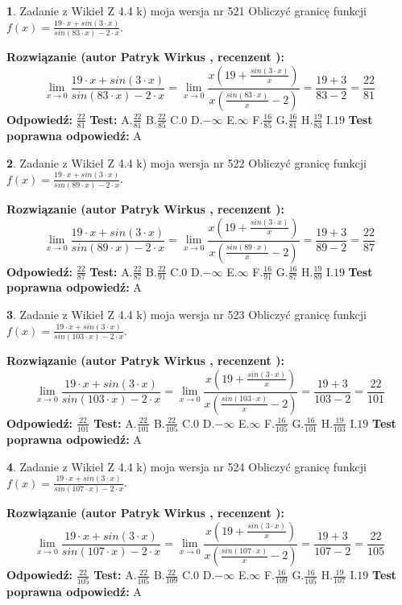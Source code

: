 \documentclass[12pt, a4paper]{article}
\theoremstyle{definition} %
\newtheorem{zad}{}
\newcommand{\zadStart}[1]{\begin{zad}#1\newline}
\newcommand{\zadStop}{\end{zad}}
\newcommand{\rozwStart}[2]{\noindent \textbf{Rozwiązanie (autor #1 , recenzent #2): }\newline}
\newcommand{\rozwStop}{\newline}
\newcommand{\odpStart}{\noindent \textbf{Odpowiedź:}\newline}
\newcommand{\odpStop}{\newline}
\newcommand{\testStart}{\noindent \textbf{Test:}\newline}
\newcommand{\testStop}{\newline}
\newcommand{\kluczStart}{\noindent \textbf{Test poprawna odpowiedź:}\newline}
\newcommand{\kluczStop}{\newline}
\begin{document}
\zadStart{Zadanie z Wikieł Z 4.4 k) moja wersja nr 521}
Obliczyć granicę funkcji $f(x)=\frac{19\cdot x +sin(3\cdot x)}{sin(83\cdot x) -2\cdot x}$.
\zadStop
\rozwStart{Patryk Wirkus}{}
$$\lim\limits_{x\to 0}\frac{19\cdot x +sin(3\cdot x)}{sin(83\cdot x) -2\cdot x}
=\lim\limits_{x\to 0}\frac{x(19+\frac{sin(3\cdot x)}{x})}{x(\frac{sin(83\cdot x)}{x}-2)}
=\frac{19+3}{83-2} = \frac{22}{81}$$
\rozwStop
\odpStart
$\frac{22}{81}$
\odpStop
\testStart
A.$\frac{22}{81}$
B.$\frac{22}{85}$
C.$0$
D.$-\infty$
E.$\infty$
F.$\frac{16}{85}$
G.$\frac{16}{81}$
H.$\frac{19}{83}$
I.$19$
\testStop
\kluczStart
A
\kluczStop



\zadStart{Zadanie z Wikieł Z 4.4 k) moja wersja nr 522}
Obliczyć granicę funkcji $f(x)=\frac{19\cdot x +sin(3\cdot x)}{sin(89\cdot x) -2\cdot x}$.
\zadStop
\rozwStart{Patryk Wirkus}{}
$$\lim\limits_{x\to 0}\frac{19\cdot x +sin(3\cdot x)}{sin(89\cdot x) -2\cdot x}
=\lim\limits_{x\to 0}\frac{x(19+\frac{sin(3\cdot x)}{x})}{x(\frac{sin(89\cdot x)}{x}-2)}
=\frac{19+3}{89-2} = \frac{22}{87}$$
\rozwStop
\odpStart
$\frac{22}{87}$
\odpStop
\testStart
A.$\frac{22}{87}$
B.$\frac{22}{91}$
C.$0$
D.$-\infty$
E.$\infty$
F.$\frac{16}{91}$
G.$\frac{16}{87}$
H.$\frac{19}{89}$
I.$19$
\testStop
\kluczStart
A
\kluczStop



\zadStart{Zadanie z Wikieł Z 4.4 k) moja wersja nr 523}
Obliczyć granicę funkcji $f(x)=\frac{19\cdot x +sin(3\cdot x)}{sin(103\cdot x) -2\cdot x}$.
\zadStop
\rozwStart{Patryk Wirkus}{}
$$\lim\limits_{x\to 0}\frac{19\cdot x +sin(3\cdot x)}{sin(103\cdot x) -2\cdot x}
=\lim\limits_{x\to 0}\frac{x(19+\frac{sin(3\cdot x)}{x})}{x(\frac{sin(103\cdot x)}{x}-2)}
=\frac{19+3}{103-2} = \frac{22}{101}$$
\rozwStop
\odpStart
$\frac{22}{101}$
\odpStop
\testStart
A.$\frac{22}{101}$
B.$\frac{22}{105}$
C.$0$
D.$-\infty$
E.$\infty$
F.$\frac{16}{105}$
G.$\frac{16}{101}$
H.$\frac{19}{103}$
I.$19$
\testStop
\kluczStart
A
\kluczStop



\zadStart{Zadanie z Wikieł Z 4.4 k) moja wersja nr 524}
Obliczyć granicę funkcji $f(x)=\frac{19\cdot x +sin(3\cdot x)}{sin(107\cdot x) -2\cdot x}$.
\zadStop
\rozwStart{Patryk Wirkus}{}
$$\lim\limits_{x\to 0}\frac{19\cdot x +sin(3\cdot x)}{sin(107\cdot x) -2\cdot x}
=\lim\limits_{x\to 0}\frac{x(19+\frac{sin(3\cdot x)}{x})}{x(\frac{sin(107\cdot x)}{x}-2)}
=\frac{19+3}{107-2} = \frac{22}{105}$$
\rozwStop
\odpStart
$\frac{22}{105}$
\odpStop
\testStart
A.$\frac{22}{105}$
B.$\frac{22}{109}$
C.$0$
D.$-\infty$
E.$\infty$
F.$\frac{16}{109}$
G.$\frac{16}{105}$
H.$\frac{19}{107}$
I.$19$
\testStop
\kluczStart
A
\kluczStop
\end{document}
